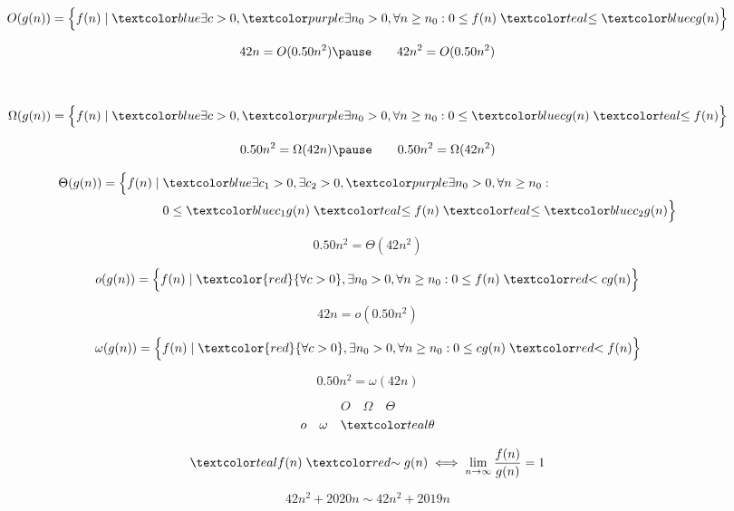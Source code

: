 \begin{frame}{}
  \[
      O(g(n)) = \Big\{f(n) \mid \blue{\exists c > 0}, 
      \purple{\exists n_0 > 0, \forall n \ge n_0}: 
      0 \le f(n) \;\teal{\le}\; \blue{c g(n)} \Big\}
  \]

  \pause
  \[
    42n = O(0.50 n^2) \pause \qquad 42n^2 = O(0.50 n^2)
  \]

  \pause
  \begin{center}
     \\[15pt] \pause
  \end{center}
\end{frame}

\begin{frame}{}
  \[
    \Omega(g(n)) = \Big\{f(n) \mid \blue{\exists c > 0}, 
    \purple{\exists n_0 > 0, \forall n \ge n_0}: 
    0 \le \blue{c g(n)} \;\teal{\le}\; f(n) \Big\}
  \]

  \pause
  \[
    0.50 n^2 = \Omega(42 n) \pause \qquad 0.50 n^2 = \Omega(42n^2)
  \]

  \pause
  \begin{align*}
    \Theta(g(n)) = \Big\{f(n) \mid\; &\blue{\exists c_1 > 0, \exists c_2 > 0}, \purple{\exists n_0 > 0, \forall n \ge n_0}: \\ 
    & 0 \le \blue{c_1 g(n)} \;\teal{\le}\; f(n) \;\teal{\le}\; \blue{c_2 g(n)} \Big\}
  \end{align*}

  \pause
  \[
    0.50 n^2 = \Theta(42n^2)
  \]
\end{frame}

\begin{frame}{}
  \[
	o(g(n)) = \Big\{f(n) \mid \textcolor{red}{\forall c > 0}, \exists n_0 > 0, \forall n \ge n_0: 0 \le f(n) \;\red{<}\; c g(n)\Big\}
  \]

  \pause
  \[
    42n = o(0.50 n^2)
  \]

  \pause
  \[
	\omega(g(n)) = \Big\{f(n) \mid \textcolor{red}{\forall c > 0}, \exists n_0 > 0, \forall n \ge n_0: 0 \le c g(n) \;\red{<}\; f(n)\Big\}
  \]

  \pause
  \[
    0.50 n^2 = \omega(42n)
  \]
\end{frame}

\begin{frame}{}
  \[
    O \quad \Omega \quad \Theta
  \]
  \[
    o \quad \omega \quad \teal{\theta}
  \]

  \pause
  \vspace{0.60cm}
  \[
	\teal{f(n) \;\red{\sim}\; g(n) \iff \lim_{n \to \infty} \frac{f(n)}{g(n)} = 1}
  \]

  \pause
  \vspace{0.60cm}
  \[
    42 n^2 + 2020 n \sim 42 n^2 + 2019 n
  \]
\end{frame}

